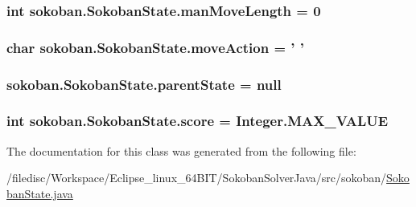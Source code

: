\hypertarget{classsokoban_1_1SokobanState_2debe85c8a268de2b87615abceec728a}{
\subsubsection[{manMoveLength}]{\setlength{\rightskip}{0pt plus 5cm}int {\bf sokoban.SokobanState.manMoveLength} = 0}}
\label{classsokoban_1_1SokobanState_2debe85c8a268de2b87615abceec728a}


\hypertarget{classsokoban_1_1SokobanState_e455b73090c57748fed538fb3db38bad}{
\subsubsection[{moveAction}]{\setlength{\rightskip}{0pt plus 5cm}char {\bf sokoban.SokobanState.moveAction} = ' '}}
\label{classsokoban_1_1SokobanState_e455b73090c57748fed538fb3db38bad}


\hypertarget{classsokoban_1_1SokobanState_0fb6fdf320205ecfa94458777874c528}{
\subsubsection[{parentState}]{ {\bf sokoban.SokobanState.parentState} = null}}
\label{classsokoban_1_1SokobanState_0fb6fdf320205ecfa94458777874c528}


\hypertarget{classsokoban_1_1SokobanState_b55163b3cfa5a1936b8d1b9355668f0a}{
\subsubsection[{score}]{\setlength{\rightskip}{0pt plus 5cm}int {\bf sokoban.SokobanState.score} = Integer.MAX\_\-VALUE}}
\label{classsokoban_1_1SokobanState_b55163b3cfa5a1936b8d1b9355668f0a}




The documentation for this class was generated from the following file:\begin{CompactItemize}
\item 
/filedisc/Workspace/Eclipse\_\-linux\_\-64BIT/SokobanSolverJava/src/sokoban/\hyperlink{SokobanState_8java}{SokobanState.java}\end{CompactItemize}

